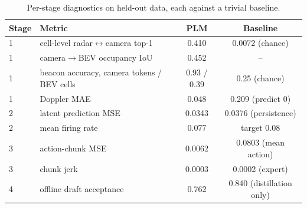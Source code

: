 \begin{table}[t]\centering\small
\caption{Per-stage diagnostics on held-out data, each against a trivial baseline.}\label{tab:stages}
\begin{tabular}{llcc}\toprule
Stage & Metric & PLM & Baseline \\\midrule
1 & cell-level radar$\leftrightarrow$camera top-1 & 0.410 & 0.0072 (chance) \\
1 & camera$\to$BEV occupancy IoU & 0.452 & -- \\
1 & beacon accuracy, camera tokens / BEV cells & 0.93 / 0.39 & 0.25 (chance) \\
1 & Doppler MAE & 0.048 & 0.209 (predict 0) \\
2 & latent prediction MSE & 0.0343 & 0.0376 (persistence) \\
2 & mean firing rate & 0.077 & target 0.08 \\
3 & action-chunk MSE & 0.0062 & 0.0803 (mean action) \\
3 & chunk jerk & 0.0003 & 0.0002 (expert) \\
4 & offline draft acceptance & 0.762 & 0.840 (distillation only) \\
\bottomrule\end{tabular}\end{table}
